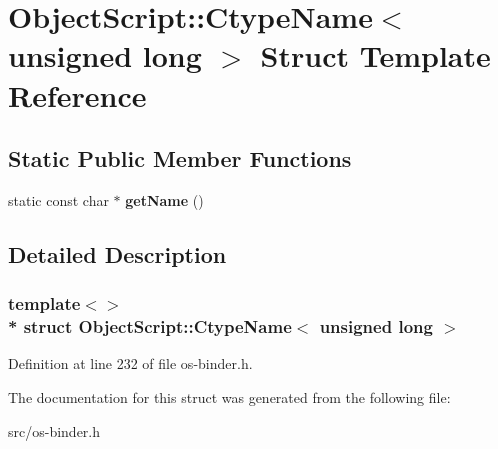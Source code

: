 \hypertarget{struct_object_script_1_1_ctype_name_3_01unsigned_01long_01_4}{}\section{Object\+Script\+:\+:Ctype\+Name$<$ unsigned long $>$ Struct Template Reference}
\label{struct_object_script_1_1_ctype_name_3_01unsigned_01long_01_4}
\subsection*{Static Public Member Functions}
\begin{DoxyCompactItemize}
\item 
static const char $\ast$ {\bfseries get\+Name} ()\hypertarget{struct_object_script_1_1_ctype_name_3_01unsigned_01long_01_4_aaad55bf8a44823dffe5010e8000325a8}{}\label{struct_object_script_1_1_ctype_name_3_01unsigned_01long_01_4_aaad55bf8a44823dffe5010e8000325a8}

\end{DoxyCompactItemize}


\subsection{Detailed Description}
\subsubsection*{template$<$$>$\\*
struct Object\+Script\+::\+Ctype\+Name$<$ unsigned long $>$}



Definition at line 232 of file os-\/binder.\+h.



The documentation for this struct was generated from the following file\+:\begin{DoxyCompactItemize}
\item 
src/os-\/binder.\+h\end{DoxyCompactItemize}
